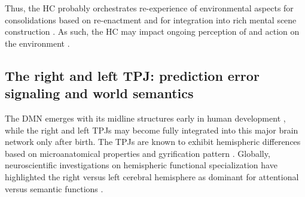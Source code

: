 \documentclass[10pt,letterpaper]{article}
\begin{document}
Thus, the HC probably orchestrates re-experience of environmental aspects for
consolidations based on re-enactment and for integration into
rich mental scene construction \citep{deuker2016event, bird2010establishing}.
As such, the HC may impact
ongoing perception of and action on the environment
\citep{maguire2016, lavilleon2015}.


\subsection{The right and left TPJ: prediction error signaling and world semantics}
The DMN emerges with its midline structures early in human development
\citep{doria2010}, while
the right and left TPJs may become fully integrated into this major brain
network only after birth.
The TPJs are known to exhibit hemispheric differences
based on microanatomical properties and gyrification pattern
\citep{seghier2013angular}.
Globally, neuroscientific investigations on hemispheric functional specialization
have highlighted the right versus left cerebral hemisphere as dominant for
attentional versus semantic functions
\citep{seghier2013angular, bzdok2013tpj, bzdok2016left}.
\end{document}
